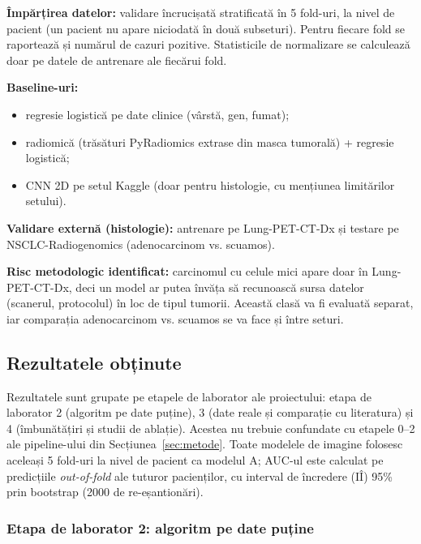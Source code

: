 \documentclass[11pt, a4paper]{article}
\begin{document}
\textbf{Împărțirea datelor:} validare încrucișată stratificată în 5 fold-uri, la nivel de pacient (un pacient nu apare niciodată în două subseturi). Pentru fiecare fold se raportează și numărul de cazuri pozitive. Statisticile de normalizare se calculează doar pe datele de antrenare ale fiecărui fold.

\textbf{Baseline-uri:}
\begin{itemize}
    \item regresie logistică pe date clinice (vârstă, gen, fumat);
    \item radiomică (trăsături PyRadiomics extrase din masca tumorală) + regresie logistică;
    \item CNN 2D pe setul Kaggle (doar pentru histologie, cu mențiunea limitărilor setului).
\end{itemize}

\textbf{Validare externă (histologie):} antrenare pe Lung-PET-CT-Dx și testare pe NSCLC-Radiogenomics (adenocarcinom vs. scuamos).

\textbf{Risc metodologic identificat:} carcinomul cu celule mici apare doar în Lung-PET-CT-Dx, deci un model ar putea învăța să recunoască sursa datelor (scanerul, protocolul) în loc de tipul tumorii. Această clasă va fi evaluată separat, iar comparația adenocarcinom vs. scuamos se va face și între seturi.

\subsection{Rezultatele obținute}

Rezultatele sunt grupate pe etapele de laborator ale proiectului: etapa de laborator 2 (algoritm pe date puține), 3 (date reale și comparație cu literatura) și 4 (îmbunătățiri și studii de ablație). Acestea nu trebuie confundate cu etapele 0--2 ale pipeline-ului din Secțiunea~\ref{sec:metode}. Toate modelele de imagine folosesc aceleași 5 fold-uri la nivel de pacient ca modelul A; AUC-ul este calculat pe predicțiile \textit{out-of-fold} ale tuturor pacienților, cu interval de încredere (IÎ) 95\% prin bootstrap (2000 de re-eșantionări).

\subsubsection{Etapa de laborator 2: algoritm pe date puține}
\end{document}
